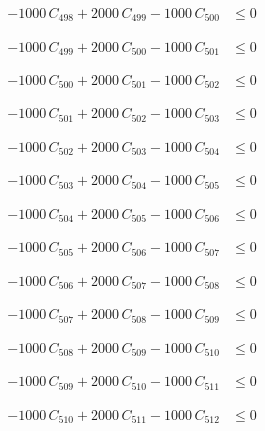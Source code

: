 \documentclass[a4paper,11pt]{article}
\begin{document}
\begin{align}
-1000\,C_{498} + 2000\,C_{499} - 1000\,C_{500} &\leq 0 \nonumber
\end{align}

\begin{align}
-1000\,C_{499} + 2000\,C_{500} - 1000\,C_{501} &\leq 0 \nonumber
\end{align}

\begin{align}
-1000\,C_{500} + 2000\,C_{501} - 1000\,C_{502} &\leq 0 \nonumber
\end{align}

\begin{align}
-1000\,C_{501} + 2000\,C_{502} - 1000\,C_{503} &\leq 0 \nonumber
\end{align}

\begin{align}
-1000\,C_{502} + 2000\,C_{503} - 1000\,C_{504} &\leq 0 \nonumber
\end{align}

\begin{align}
-1000\,C_{503} + 2000\,C_{504} - 1000\,C_{505} &\leq 0 \nonumber
\end{align}

\begin{align}
-1000\,C_{504} + 2000\,C_{505} - 1000\,C_{506} &\leq 0 \nonumber
\end{align}

\begin{align}
-1000\,C_{505} + 2000\,C_{506} - 1000\,C_{507} &\leq 0 \nonumber
\end{align}

\begin{align}
-1000\,C_{506} + 2000\,C_{507} - 1000\,C_{508} &\leq 0 \nonumber
\end{align}

\begin{align}
-1000\,C_{507} + 2000\,C_{508} - 1000\,C_{509} &\leq 0 \nonumber
\end{align}

\begin{align}
-1000\,C_{508} + 2000\,C_{509} - 1000\,C_{510} &\leq 0 \nonumber
\end{align}

\begin{align}
-1000\,C_{509} + 2000\,C_{510} - 1000\,C_{511} &\leq 0 \nonumber
\end{align}

\begin{align}
-1000\,C_{510} + 2000\,C_{511} - 1000\,C_{512} &\leq 0 \nonumber
\end{align}
\end{document}
